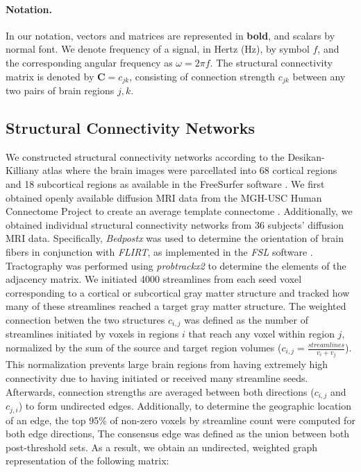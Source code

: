 \documentclass{article}
\begin{document}
\paragraph{Notation.} In our notation, vectors and matrices are represented in \textbf{bold}, and scalars by normal font. We denote frequency of a signal, in Hertz (Hz), by symbol $f$, and the corresponding angular frequency as $\omega = 2 \pi f$. The structural connectivity matrix is denoted by $\bm{C} = c_{jk}$, consisting of connection strength $c_{jk}$ between any two pairs of brain regions $j,k$.

\subsection{Structural Connectivity Networks} We constructed structural connectivity networks according to the Desikan-Killiany atlas where the brain images were parcellated into 68 cortical regions and 18 subcortical regions as available in the FreeSurfer software \cite{Fischl2002, Desikan2006}. We first obtained openly available diffusion MRI data from the MGH-USC Human Connectome Project to create an average template connectome \cite{McNab2013}. Additionally, we obtained individual structural connectivity networks from 36 subjects' diffusion MRI data. Specifically, \textit{Bedpostx} was used to determine the orientation of brain fibers in conjunction with \textit{FLIRT}, as implemented in the \textit{FSL} software \cite{Jenkinson2012}. Tractography was performed using \textit{probtrackx2} to determine the elements of the adjacency matrix. We initiated 4000 streamlines from each seed voxel corresponding to a cortical or subcortical gray matter structure and tracked how many of these streamlines reached a target gray matter structure. The weighted connection betwen the two structures $c_{i,j}$ was defined as the number of streamlines initiated by voxels in regions $i$ that reach any voxel within region $j$, normalized by the sum of the source and target region volumes ($c_{i,j} = \frac{streamlines}{v_i + v_j}$). This normalization prevents large brain regions from having extremely high connectivity due to having initiated or received many streamline seeds. Afterwards, connection strengths are averaged between both directions ($c_{i,j}$ and $c_{j,i}$) to form undirected edges. Additionally, to determine the geographic location of an edge, the top 95\% of non-zero voxels by streamline count were computed for both edge directions, The consensus edge was defined as the union between both post-threshold sets. As a result, we obtain an undirected, weighted graph representation of the following matrix:
\end{document}
